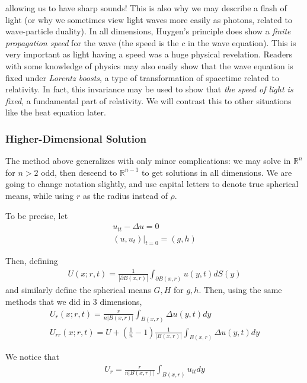 \documentclass{article}
\newcommand{\R}{{\mathbb{R}}}
\newcommand{\pd}{\partial}
\begin{document}
	allowing us to have sharp sounds! This is also why we may describe a flash of light (or why we sometimes view light waves more easily as photons, related to wave-particle duality). In all dimensions, Huygen's principle does show a \textit{finite propagation speed} for the wave (the speed is the $c$ in the wave equation). This is very important as light having a speed was a huge physical revelation. Readers with some knowledge of physics may also easily show that the wave equation is fixed under \textit{Lorentz boosts}, a type of transformation of spacetime related to relativity. In fact, this invariance may be used to show that \textit{the speed of light is fixed}, a fundamental part of relativity. We will contrast this to other situations like the heat equation later. 
	
	
	
	
	
	
	\subsubsection{Higher-Dimensional Solution}
	
	The method above generalizes with only minor complications: we may solve in $\R^{n}$ for $n>2$ odd, then descend to $\R^{n-1}$ to get solutions in all dimensions. We are going to change notation slightly, and use capital letters to denote true spherical means, while using $r$ as the radius instead of $\rho$.
	
	
	To be precise, let 
	\begin{align*}
		u_{tt} - \Delta u = 0 \\
		(u,u_t)|_{t=0} = (g,h)
	\end{align*}
	
	Then, defining 
	\begin{align*}
		U(x;r,t) = \frac{1}{|\pd B(x,r)|} \int_{\pd B(x,r)}u(y,t) dS(y)
	\end{align*}
	and similarly define the spherical means $G,H$ for $g,h$. Then, using the same methods that we did in $3$ dimensions,
	\begin{align*}
		U_{r}(x;r,t) = \frac{r}{n |B(x,r)|} \int_{B(x,r)} \Delta u(y,t) dy \\
		U_{rr}(x;r,t) = U + \left(\frac{1}{n} -1 \right)   \frac{1}{|B(x,r)|}\int_{B(x,r)} \Delta u(y,t) dy
	\end{align*}
	
	We notice that 
	\begin{align*}
		U_{r} = \frac{r}{n|B(x,r)|} \int_{B(x,r)} u_{tt} dy
	\end{align*}
	
\end{document}

